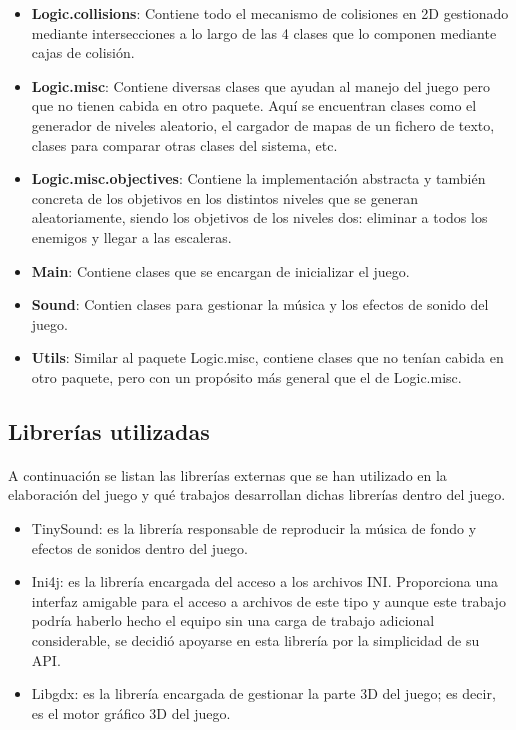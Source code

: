 \documentclass[a4paper]{article}
\begin{document}
\begin{itemize}
	\item \textbf{Logic.collisions}: Contiene todo el mecanismo de colisiones en 2D gestionado mediante intersecciones a lo largo de las 4 clases que lo componen mediante cajas de colisión.
	
	\item \textbf{Logic.misc}: Contiene diversas clases que ayudan al manejo del juego pero que no tienen cabida en otro paquete. Aquí se encuentran clases como el generador de niveles aleatorio, el cargador de mapas de un fichero de texto, clases para comparar otras clases del sistema, etc.
	
	\item \textbf{Logic.misc.objectives}: Contiene la implementación abstracta y también concreta de los objetivos en los distintos niveles que se generan aleatoriamente, siendo los objetivos de los niveles dos: eliminar a todos los enemigos y llegar a las escaleras.
	
	\item \textbf{Main}: Contiene clases que se encargan de inicializar el juego.
	
	\item \textbf{Sound}: Contien clases para gestionar la música y los efectos de sonido del juego.
	
	\item \textbf{Utils}: Similar al paquete Logic.misc, contiene clases que no tenían cabida en otro paquete, pero con un propósito más general que el de Logic.misc.
\end{itemize}
\newpage
\subsection{Librerías utilizadas}

\paragraph{}A continuación se listan las librerías externas que se han utilizado en la elaboración del juego y qué trabajos desarrollan dichas librerías dentro del juego.

\begin{itemize}
\item TinySound: es la librería responsable de reproducir la música de fondo y efectos de sonidos dentro del juego.

\item Ini4j: es la librería encargada del acceso a los archivos INI. Proporciona una interfaz amigable para el acceso a archivos de este tipo y aunque este trabajo podría haberlo hecho el equipo sin una carga de trabajo adicional considerable, se decidió apoyarse en esta librería por la simplicidad de su API.

\item Libgdx: es la librería encargada de gestionar la parte 3D del juego; es decir, es el motor gráfico 3D del juego.
\end{itemize}
\end{document}
